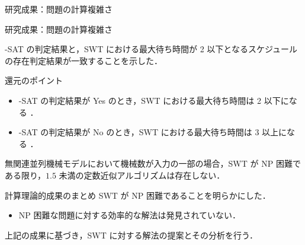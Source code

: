 \documentclass[dvipdfmx]{beamer}
\begin{document}
    \begin{frame}{研究成果：問題の計算複雑さ}
      \begin{block}{}

      \end{block}
    \end{frame}

    \begin{frame}{研究成果：問題の計算複雑さ}

      {-SAT} の判定結果と，SWT における最大待ち時間が \alert{2 以下}となるスケジュールの存在判定結果が一致することを示した．

      \begin{block}{還元のポイント}
        \begin{itemize}
          \item {-SAT} の判定結果が \alert{Yes} のとき，SWT における最大待ち時間は \alert{2 以下}になる ．
          \item {-SAT} の判定結果が \alert{No} のとき，SWT における最大待ち時間は \alert{3 以上}になる ．
        \end{itemize}
      \end{block}
      無関連並列機械モデルにおいて機械数が入力の一部の場合，SWT が NP 困難である限り，$1.5$ 未満の定数近似アルゴリズムは存在しない．
      \begin{alertblock}{計算理論的成果のまとめ}
        SWT が NP 困難であることを明らかにした．
        \begin{itemize}
          \item NP 困難な問題に対する効率的な解法は発見されていない．
        \end{itemize}
      \end{alertblock}
      上記の成果に基づき，SWT に対する解法の提案とその分析を行う．
    \end{frame}
\end{document}
